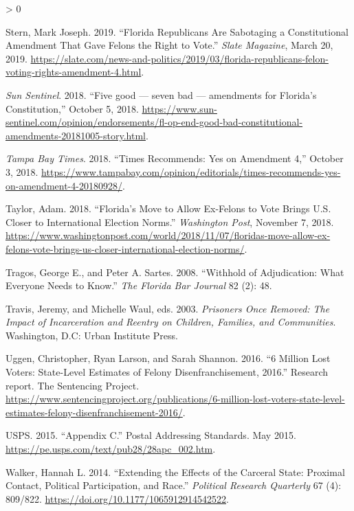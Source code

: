 \documentclass[
  12pt,
]{article}
\newlength{\cslhangindent}
\newenvironment{CSLReferences}[2] %
 {%
  \setlength{\parindent}{0pt}
  \ifodd #1 \everypar{\setlength{\hangindent}{\cslhangindent}}\ignorespaces\fi
  \ifnum #2 > 0
  \setlength{\parskip}{#2\baselineskip}
  \fi
 }%
 {}
\begin{document}
\begin{CSLReferences}{1}{0}
\leavevmode\hypertarget{ref-Stern2019}{}%
Stern, Mark Joseph. 2019. {``Florida {Republicans Are Sabotaging} a {Constitutional Amendment That Gave Felons} the {Right} to {Vote}.''} \emph{Slate Magazine}, March 20, 2019. \url{https://slate.com/news-and-politics/2019/03/florida-republicans-felon-voting-rights-amendment-4.html}.

\leavevmode\hypertarget{ref-SunSentinelEditorial2018}{}%
\emph{Sun Sentinel}. 2018. {``Five good --- seven bad --- amendments for Florida's Constitution,''} October 5, 2018. \url{https://www.sun-sentinel.com/opinion/endorsements/fl-op-end-good-bad-constitutional-amendments-20181005-story.html}.

\leavevmode\hypertarget{ref-tampabaytimes2018}{}%
\emph{Tampa Bay Times}. 2018. {``Times Recommends: {Yes} on {Amendment} 4,''} October 3, 2018. \url{https://www.tampabay.com/opinion/editorials/times-recommends-yes-on-amendment-4-20180928/}.

\leavevmode\hypertarget{ref-Taylor2018}{}%
Taylor, Adam. 2018. {``Florida's Move to Allow Ex-Felons to Vote Brings {U}.{S}. Closer to International Election Norms.''} \emph{Washington Post}, November 7, 2018. \url{https://www.washingtonpost.com/world/2018/11/07/floridas-move-allow-ex-felons-vote-brings-us-closer-international-election-norms/}.

\leavevmode\hypertarget{ref-Tragos2008}{}%
Tragos, George E., and Peter A. Sartes. 2008. {``Withhold of {Adjudication}: {What Everyone Needs} to {Know}.''} \emph{The Florida Bar Journal} 82 (2): 48.

\leavevmode\hypertarget{ref-Travis2003}{}%
Travis, Jeremy, and Michelle Waul, eds. 2003. \emph{Prisoners Once Removed: The Impact of Incarceration and Reentry on Children, Families, and Communities}. {Washington, D.C}: {Urban Institute Press}.

\leavevmode\hypertarget{ref-sentencing_2016}{}%
Uggen, Christopher, Ryan Larson, and Sarah Shannon. 2016. {``6 {Million Lost Voters}: {State}-{Level Estimates} of {Felony Disenfranchisement}, 2016.''} Research report. {The Sentencing Project}. \url{https://www.sentencingproject.org/publications/6-million-lost-voters-state-level-estimates-felony-disenfranchisement-2016/}.

\leavevmode\hypertarget{ref-USPS2015}{}%
USPS. 2015. {``Appendix {C}.''} {Postal Addressing Standards}. May 2015. \url{https://pe.usps.com/text/pub28/28apc_002.htm}.

\leavevmode\hypertarget{ref-Walker2014}{}%
Walker, Hannah L. 2014. {``Extending the {Effects} of the {Carceral State}: {Proximal Contact}, {Political Participation}, and {Race}.''} \emph{Political Research Quarterly} 67 (4): 809/822. \url{https://doi.org/10.1177/1065912914542522}.


\end{CSLReferences}
\end{document}
